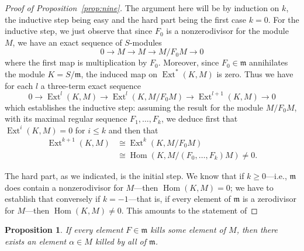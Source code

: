 \documentclass{bull-l}
\newcommand{\Ext}{\operatorname{Ext}}
\newcommand{\Hom}{\operatorname{Hom}}
\newtheorem{prop}{Proposition}
\theoremstyle{pplain}
\theoremstyle{definition}
\begin{document}
\begin{proof}[Proof of Proposition~\ref{prop:nine}]
The argument here will be by induction on $k$, the inductive step being easy
and the hard part being the first case $k=0$.  For the inductive step, we just
observe that since $F_0$ is a nonzerodivisor for the module $M$, we have an
exact sequence of $S$-modules
\[0\to M\to M\to M/F_0M\to 0\]
where the first map is multiplication by $F_0$. Moreover, since $F_0\in
\mathfrak{m}$ annihilates the module $K=S/\mathfrak{m}$, the induced map on
$\Ext^*(K,M)$ is zero.  Thus we have for each $l$ a three-term exact sequence
\[0\to \Ext^l(K,M)\to \Ext^l(K,M/F_0M)\to \Ext^{l+1}(K,M)\to 0\]
which establishes the inductive step: assuming the result for the module
$M/F_0M$, with its maximal regular sequence $F_1,\dots,F_k$, we deduce first
that $\Ext^i(K,M)=0$ for $i\le k$ and then that
\begin{equation*} 
\begin{split}
\Ext^{k+1}(K,M)&\cong  \Ext^k(K,M/F_0M)\\
&\cong \Hom(K,M/(F_0,\dots,F_k)M)\ne 0.
\end{split}
\end{equation*}

The hard part, as we indicated, is the initial step.  We know that if $k\ge
0$---i.e.,  $\mathfrak{m}$ does contain a nonzerodivisor for $M$---then
$\Hom(K,M)=0$; we have to establish that conversely if $k=-1$---that is, if
every element of $\mathfrak{m}$ is a zerodivisor for $M$---then $\Hom(K,M) \ne
0$.  This amounts to the statement of
\renewcommand{\qed}{}
\end{proof}

\begin{prop} \label{prop:ten}
If every element $F\in \mathfrak{m}$ kills some element of $M$, then there
exists an element $\alpha\in M$ killed by all of $\mathfrak{m}$.
\end{prop}
\end{document}

